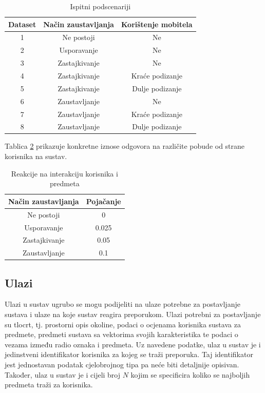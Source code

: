 \documentclass[times, utf8, diplomski, numeric]{fer}
\begin{document}
\begin{table}[!htb]
	\caption{Ispitni podscenariji}
	\label{tbl:podscenariji}
	\centering
	\begin{tabular}{|c|c|c|} \hline		
		Dataset & Način zaustavljanja & Korištenje mobitela\\ \hline
		1 & Ne postoji & Ne\\
		2 & Usporavanje & Ne\\
		3 & Zastajkivanje & Ne\\
		4 & Zastajkivanje & Kraće podizanje\\
		5 & Zastajkivanje & Dulje podizanje\\
		6 & Zaustavljanje & Ne\\
		7 & Zaustavljanje & Kraće podizanje\\
		8 & Zaustavljanje & Dulje podizanje\\ \hline
	\end{tabular}
\end{table}

Tablica \ref{tbl:reinforcement} prikazuje konkretne iznose odgovora na različite
pobude od strane korisnika na sustav.

\begin{table}[!htb]
	\caption{Reakcije na interakciju korisnika i predmeta}
	\label{tbl:reinforcement}
	\centering
	\begin{tabular}{|c|c|} \hline		
		Način zaustavljanja & Pojačanje\\ \hline
		Ne postoji & 0\\
		Usporavanje & 0.025\\
		Zastajkivanje & 0.05\\
		Zaustavljanje & 0.1\\ \hline
	\end{tabular}
\end{table}


\subsection{Ulazi}
Ulazi u sustav ugrubo se mogu podijeliti na ulaze potrebne za postavljanje
sustava i ulaze na koje sustav reagira preporukom. Ulazi potrebni za
postavljanje su tlocrt, tj. prostorni opis okoline, podaci o ocjenama korisnika
sustava za predmete, predmeti sustava sa vektorima svojih karakteristika te
podaci o vezama između radio oznaka i predmeta. Uz navedene podatke, ulaz u
sustav je i jedinstveni identifikator korisnika za kojeg se traži preporuka. Taj
identifikator jest jednostavan podatak cjelobrojnog tipa pa neće biti detaljnije
opisivan. Također, ulaz u sustav je i cijeli broj $N$ kojim se specificira
koliko se najboljih predmeta traži za korisnika.
\end{document}
